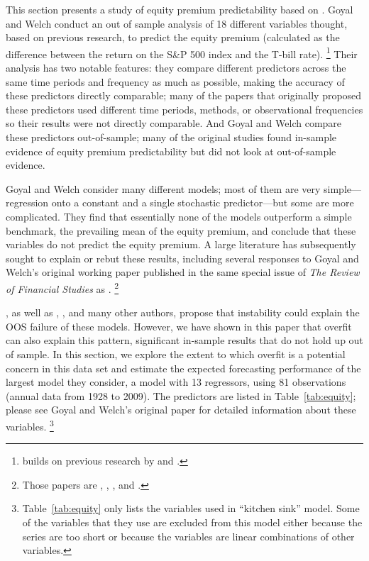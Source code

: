 \documentclass[12pt]{article}
\begin{document}
This section presents a study of equity premium predictability based
on \citet{GoW:08}. Goyal and Welch conduct an out of sample analysis
of 18 different variables thought, based on previous research, to
predict the equity premium (calculated as the difference between the
return on the S\&P 500 index and the T-bill rate).%
\footnote{\citet{GoW:08} builds on previous research by \citet{BoH:99}
  and \cite{GoW:03}.} %
Their analysis has two notable features: they compare different
predictors across the same time periods and frequency as much as
possible, making the accuracy of these predictors directly comparable;
many of the papers that originally proposed these predictors used
different time periods, methods, or observational frequencies so their
results were not directly comparable. And Goyal and Welch compare
these predictors out-of-sample; many of the original studies found
in-sample evidence of equity premium predictability but did not look
at out-of-sample evidence.

Goyal and Welch consider many different models; most of them are very
simple---regression onto a constant and a single stochastic
predictor---but some are more complicated. They find that essentially
none of the models outperform a simple benchmark, the prevailing mean
of the equity premium, and conclude that these variables do not
predict the equity premium. A large literature has subsequently sought
to explain or rebut these results, including several responses to
Goyal and Welch's original working paper published in the same special
issue of \textit{The Review of Financial Studies} as \citet{GoW:08}.%
\footnote{Those papers are \citet{CaT:08}, \citet{Coc:08},
  \citet{BRW:08}, and \citet{LeN:08}.} %

\citet{GoW:08}, as well as \citet{BoH:99}, \citet{LeN:08}, and many
other authors, propose that instability could explain the OOS failure
of these models. However, we have shown in this paper that overfit can
also explain this pattern, significant in-sample results that do not
hold up out of sample. In this section, we explore the extent to which
overfit is a potential concern in this data set and estimate the
expected forecasting performance of the largest model they consider, a
model with 13 regressors, using 81 observations (annual data from 1928
to 2009). The predictors are listed in Table~\ref{tab:equity}; please
see Goyal and Welch's original paper for detailed information about
these variables.%
\footnote{Table~\ref{tab:equity} only lists the variables used in
   ``kitchen sink'' model.  Some of the variables that
  they use are excluded from this model either
  because the series are too short or because the variables are linear
  combinations of other variables.} %
\end{document}
